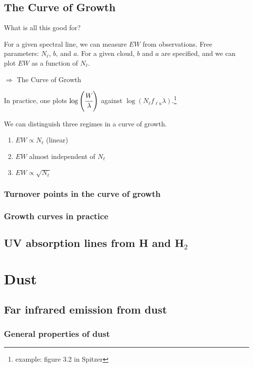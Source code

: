 \documentclass[12pt]{article}
\newcommand{\mar}[1]{\hspace{0pt}\marginpar{-\textcolor{black}{#1}-}}
\begin{document}
\subsection{The Curve of Growth}
What is all this good for?

For a given spectral line, we can measure $EW$ from observations.
Free parameters: $N_{\ell}$, $b$, and $a$. For a given cloud, $b$
and $a$ are specified, and we can plot $EW$ as a function of $N_{\ell}$.
\begin{center}
    $\Longrightarrow$ The Curve of Growth
\end{center}
In practice, one plots $\log\left(\cfrac{W}{\lambda}\right)$ against
$\log\left(N_{\ell}f_{\ell{u}}\lambda\right)$.\footnote{
    example: figure 3.2 in Spitzer}

We can distinguish three regimes in a curve of growth.
\begin{enumerate}[label={\Roman*}]
    \item \mar{93}$EW \propto N_{\ell}$ (linear)
    \item $EW$ almost independent of $N_{\ell}$
    \item $EW \propto \sqrt{N_{\ell}}$
\end{enumerate}

\mar{94}

\subsubsection{Turnover points in the curve of growth}

\subsubsection{Growth curves in practice}

\subsection{UV absorption lines from H and H$_{2}$}
\mar{96}

\newpage
\section{Dust}
\mar{104}
\subsection{Far infrared emission from dust}



\subsubsection{General properties of dust}
\end{document}
